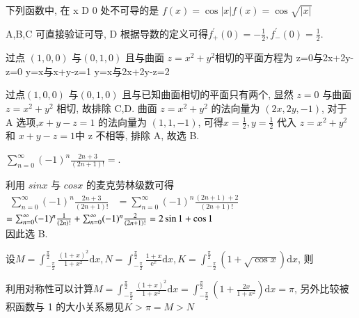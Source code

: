 \documentclass[kindlepaper]{BHCexam4kindle}
\begin{document}
\printanswers %
	\fubiaoti{}
	\maketitle
	\begin{questions}
		\qs 下列函数中, 在 x D 0 处不可导的是\xx
		{$f(x)=\cos |x|$}{$f(x)=\cos \sqrt{|x|}$}
		\begin{solution}
			A,B,C 可直接验证可导, D 根据导数的定义可得$f_{+}^{\prime}(0)=-\frac{1}{2}, f_{-}^{\prime}(0)=\frac{1}{2}$.
		\end{solution}

		\qs 过点 $(1,0,0)$ 与$(0,1,0)$ 且与曲面 $z=x^{2}+y^{2}$相切的平面方程为\xx
			   {z=0与2x+2y-z=0}
			   {y=x与x+y-z=1}
			   {y=x与2x+2y-z=2}
		\begin{solution}
			过点$(1,0,0)$ 与$(0,1,0)$ 且与已知曲面相切的平面只有两个, 显然 $z = 0$ 与曲面$z=x^{2}+y^{2}$
			相切, 故排除 C,D. 曲面 $z=x^{2}+y^{2}$ 的法向量为 $(2 x, 2 y,-1)$, 对于 A 选项,$x+y-z=1$
			的法向量为 $(1,1,-1)$, 可得$x=\frac{1}{2}, y=\frac{1}{2}$ 代入 $z=x^{2}+y^{2}$ 和 $x+y-z=1$中 z 不相等,
			排除 A, 故选 B.
		\end{solution}

		\qs $\sum_{n=0}^{\infty}(-1)^{n} \frac{2 n+3}{(2 n+1) !}=$\xx.
		\begin{solution}
			
			利用 $sin x$ 与 $cos x$ 的麦克劳林级数可得\\
		$\begin{aligned} \sum_{n=0}^{\infty}(-1)^{n} \frac{2 n+3}{(2 n+1) !} 
		&=\sum_{n=0}^{\infty}(-1)^{n} \frac{(2 n+1)+2}{(2 n+1) !} \end{aligned}$\\
		$
=\sum_{n=0}^{\infty}(-1)^{n} \frac{1}{(2 n) !}+\sum_{n=0}^{\infty}(-1)^{n} \frac{2}{(2 n+1) !} 
\\=2 \sin 1+\cos 1 $\\
			因此选 B.
		\end{solution}

		\qs 设$M=\int_{-\frac{\pi}{2}}^{\frac{\pi}{2}} \frac{(1+x)^{2}}{1+x^{2}} \mathrm{d} x, N=\int_{-\frac{\pi}{2}}^{\frac{\pi}{2}} \frac{1+x}{\mathrm{e}^{x}} \mathrm{d} x, K=\int_{-\frac{\pi}{2}}^{\frac{\pi}{2}}(1+\sqrt{\cos x}) \mathrm{d} x$,
		则\xx
		\begin{solution}
			利用对称性可以计算$M=\int_{-\frac{\pi}{2}}^{\frac{\pi}{2}} \frac{(1+x)^{2}}{1+x^{2}} \mathrm{d} x=\int_{-\frac{\pi}{2}}^{\frac{\pi}{2}}\left(1+\frac{2 x}{1+x^{2}}\right) \mathrm{d} x=\pi$,
			另外比较被积函数与 1 的大小关系易见$K>\pi=M>N$
		\end{solution}


\end{questions}
\end{document}
